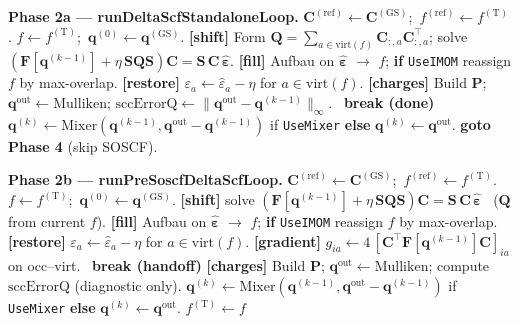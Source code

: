\documentclass[11pt,a4paper]{article}
\newcommand{\FF}{\mathbf{F}}
\newcommand{\CC}{\mathbf{C}}
\newcommand{\SS}{\mathbf{S}}
\newcommand{\qq}{\mathbf{q}}
\begin{document}
\begin{algorithm}[H]
\caption{Phase 2: level-shifted Delta-SCF. Exactly one of 2a or 2b runs,
selected by \texttt{tSoscf}.}
\label{alg:full-deltaSCF}
\footnotesize
\begin{algorithmic}[1]

 
  \State \textbf{Phase 2a --- runDeltaScfStandaloneLoop.}
   $\CC^{(\mathrm{ref})}\gets\CC^{(\mathrm{GS})}$;\ $f^{(\mathrm{ref})}\gets f^{(\mathrm{T})}$. \EndIf
  \State $f\gets f^{(\mathrm{T})}$;\ $\qq^{(0)}\gets\qq^{(\mathrm{GS})}$.
    \State \textbf{[shift]} Form $\mathbf{Q}=\sum_{a\in\mathrm{virt}(f)}\CC_{:,a}\CC_{:,a}^{\top}$; solve $(\FF[\qq^{(k-1)}]+\eta\,\SS\mathbf{Q}\SS)\CC=\SS\,\CC\,\widehat{\bm{\varepsilon}}$.
    \State \textbf{[fill]} Aufbau on $\widehat{\bm{\varepsilon}}$ $\to$ $f$; \textbf{if} \texttt{UseIMOM} reassign $f$ by max-overlap.
    \State \textbf{[restore]} $\varepsilon_a\gets\widehat{\varepsilon}_a-\eta$ for $a\in\mathrm{virt}(f)$.
    \State \textbf{[charges]} Build $\mathbf{P}$; $\qq^{\mathrm{out}}\gets\mathrm{Mulliken}$; $\mathrm{sccErrorQ}\gets\|\qq^{\mathrm{out}}-\qq^{(k-1)}\|_\infty$.
    \ \textbf{break (done)} \EndIf
    \State $\qq^{(k)}\gets\mathrm{Mixer}(\qq^{(k-1)},\qq^{\mathrm{out}}-\qq^{(k-1)})$ if \texttt{UseMixer} \textbf{else} $\qq^{(k)}\gets\qq^{\mathrm{out}}$.
  \EndFor
  \State \textbf{goto Phase 4} (skip SOSCF).
\Else

  \Statex
  \State \textbf{Phase 2b --- runPreSoscfDeltaScfLoop.} 
   $\CC^{(\mathrm{ref})}\gets\CC^{(\mathrm{GS})}$;\ $f^{(\mathrm{ref})}\gets f^{(\mathrm{T})}$. \EndIf
  \State $f\gets f^{(\mathrm{T})}$;\ $\qq^{(0)}\gets\qq^{(\mathrm{GS})}$.
    \State \textbf{[shift]} solve $(\FF[\qq^{(k-1)}]+\eta\,\SS\mathbf{Q}\SS)\CC=\SS\,\CC\,\widehat{\bm{\varepsilon}}$ \ ($\mathbf{Q}$ from current $f$).
    \State \textbf{[fill]} Aufbau on $\widehat{\bm{\varepsilon}}$ $\to$ $f$; \textbf{if} \texttt{UseIMOM} reassign $f$ by max-overlap.
    \State \textbf{[restore]} $\varepsilon_a\gets\widehat{\varepsilon}_a-\eta$ for $a\in\mathrm{virt}(f)$.
    \State \textbf{[gradient]} $g_{ia}\gets 4\,[\CC^{\top}\FF[\qq^{(k-1)}]\CC]_{ia}$ on occ--virt.
    \ \textbf{break (handoff)} \EndIf
    \State \textbf{[charges]} Build $\mathbf{P}$; $\qq^{\mathrm{out}}\gets\mathrm{Mulliken}$; compute $\mathrm{sccErrorQ}$ (diagnostic only).
    \State $\qq^{(k)}\gets\mathrm{Mixer}(\qq^{(k-1)},\qq^{\mathrm{out}}-\qq^{(k-1)})$ if \texttt{UseMixer} \textbf{else} $\qq^{(k)}\gets\qq^{\mathrm{out}}$.
  \EndFor
  \State $f^{(\mathrm{T})}\gets f$ 

\EndIf

\end{algorithmic}
\end{algorithm}
\end{document}
